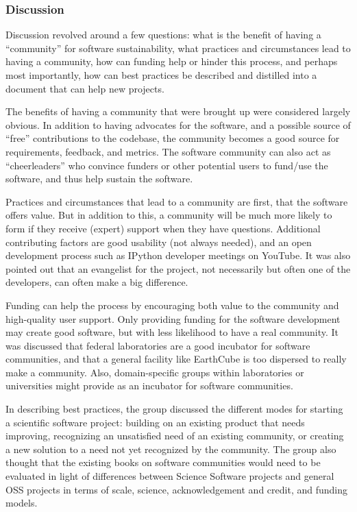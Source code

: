 \subsubsection{Discussion}

Discussion revolved around a few questions: what is the benefit of having a
``community'' for software sustainability, what practices and circumstances lead
to having a community, how can funding help or hinder this process, and perhaps
most importantly, how can best practices be described and distilled into a
document that can help new projects.

The benefits of having a community that were brought up were considered largely
obvious. In addition to having advocates for the software, and a possible source
of ``free'' contributions to the codebase, the community becomes a good source
for requirements, feedback, and metrics. The software community can also act as
``cheerleaders'' who convince funders or other potential users to fund/use the
software, and thus help sustain the software.

Practices and circumstances that lead to a community are first, that the
software offers value. But in addition to this, a community will be much more
likely to form if they receive (expert) support when they have questions.
Additional contributing factors are good usability (not always needed), and an
open development process such as IPython developer meetings on YouTube. It was
also pointed out that an evangelist for the project, not necessarily but often
one of the developers, can often make a big difference.

Funding can help the process by encouraging both value to the community and
high-quality user support. Only providing funding for the software development
may create good software, but with less likelihood to have a real community. It
was discussed that federal laboratories are a good incubator for software
communities, and that a general facility like EarthCube is too dispersed to
really make a community. Also, domain-specific groups within laboratories or
universities might provide as an incubator for software communities.

In describing best practices, the group discussed the different modes for
starting a scientific software project: building on an existing product that
needs improving, recognizing an unsatisfied need of an existing community, or
creating a new solution to a need not yet recognized by the community. The group
also thought that the existing books on software communities would need to be
evaluated in light of differences between Science Software projects and general
OSS projects in terms of scale, science, acknowledgement and credit, and funding
models.

